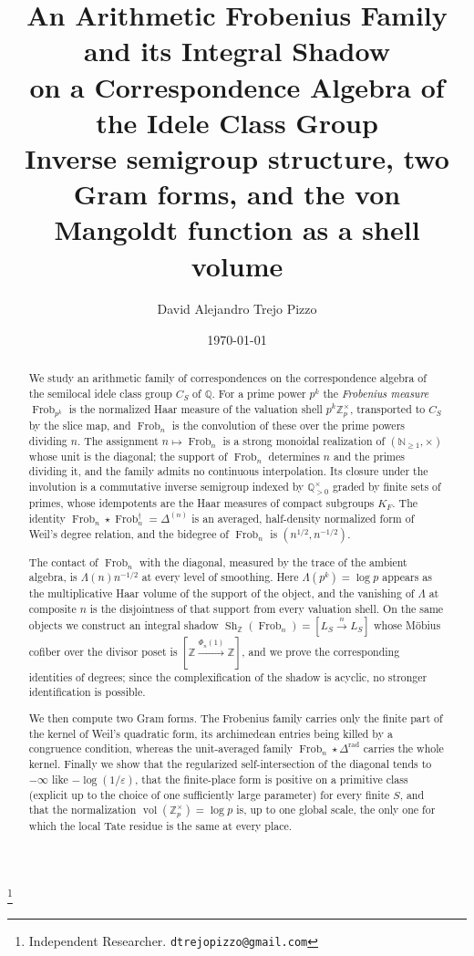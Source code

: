\documentclass[11pt]{amsart}
\theoremstyle{definition}
\theoremstyle{remark}
\newcommand{\N}{\mathbb N}
\newcommand{\Z}{\mathbb Z}
\newcommand{\Q}{\mathbb Q}
\newcommand{\Frob}{\operatorname{Frob}}
\newcommand{\Sh}{\operatorname{Sh}}
\newcommand{\vol}{\operatorname{vol}}
\begin{document}
\title[An arithmetic Frobenius family and its integral shadow]
{An Arithmetic Frobenius Family and its Integral Shadow\\
on a Correspondence Algebra of the Idele Class Group\\[4pt]
\large Inverse semigroup structure, two Gram forms,
and the von Mangoldt function as a shell volume}

\author{David Alejandro Trejo Pizzo}
\thanks{Independent Researcher. \texttt{dtrejopizzo@gmail.com}}

\date{\today}

\begin{abstract}
We study an arithmetic family of correspondences on the correspondence
algebra of the semilocal idele class group $C_S$ of $\Q$.  For a prime power
$p^k$ the \emph{Frobenius measure} $\Frob_{p^k}$ is the normalized Haar
measure of the valuation shell $p^k\Z_p^\times$, transported to $C_S$ by the
slice map, and $\Frob_n$ is the convolution of these over the prime powers
dividing $n$.  The assignment $n\mapsto\Frob_n$ is a strong monoidal
realization of $(\N_{\ge1},\times)$ whose unit is the diagonal; the support of
$\Frob_n$ determines $n$ and the primes dividing it, and the family admits no
continuous interpolation.  Its closure under the involution is a commutative
inverse semigroup indexed by $\Q_{>0}^\times$ graded by finite sets of primes,
whose idempotents are the Haar measures of compact subgroups $K_F$.  The
identity $\Frob_n\star\Frob_n^\dagger=\Delta^{(n)}$ is an averaged,
half-density normalized form of Weil's degree relation, and the bidegree of
$\Frob_n$ is $(n^{1/2},n^{-1/2})$.

The contact of $\Frob_n$ with the diagonal, measured by the trace of the
ambient algebra, is $\Lambda(n)n^{-1/2}$ at every level of smoothing.  Here
$\Lambda(p^k)=\log p$ appears as the multiplicative Haar volume of the support
of the object, and the vanishing of $\Lambda$ at composite $n$ is the
disjointness of that support from every valuation shell.  On the same objects
we construct an integral shadow $\Sh_\Z(\Frob_n)=[L_S\xrightarrow{n}L_S]$
whose M\"obius cofiber over the divisor poset is
$[\Z\xrightarrow{\Phi_n(1)}\Z]$, and we prove the corresponding identities of
degrees; since the complexification of the shadow is acyclic, no stronger
identification is possible.

We then compute two Gram forms.  The Frobenius family carries only the finite
part of the kernel of Weil's quadratic form, its archimedean entries being
killed by a congruence condition, whereas the unit-averaged family
$\Frob_n\star\Delta^{\mathrm{rad}}$ carries the whole kernel.  Finally we show
that the regularized self-intersection of the diagonal tends to $-\infty$ like
$-\log(1/\varepsilon)$, that the finite-place form is positive on a primitive class (explicit up to the choice of one
sufficiently large parameter) for every finite $S$, and that the normalization
$\vol(\Z_p^\times)=\log p$ is, up to one global scale, the only one for which
the local Tate residue is the same at every place.
\end{abstract}
\end{document}
